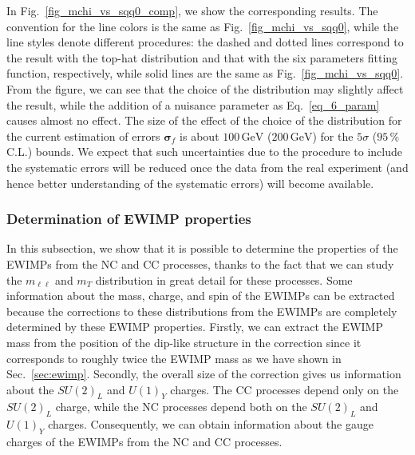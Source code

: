 \documentclass[12pt,twoside,book]{article}
\begin{document}
In Fig.~\ref{fig_mchi_vs_sqq0_comp}, we show the corresponding
results.  The convention for the line colors is the same as
Fig.~\ref{fig_mchi_vs_sqq0}, while the line styles denote different
procedures: the dashed and dotted lines correspond to the result with
the top-hat distribution and that with the six parameters fitting
function, respectively, while solid lines are the same as
Fig.~\ref{fig_mchi_vs_sqq0}.  From the figure, we can see that the
choice of the distribution may slightly affect the result, while the
addition of a nuisance parameter as Eq.~\eqref{eq_6_param} causes
almost no effect.  The size of the effect of the choice of the
distribution for the current estimation of errors $\bm{\sigma}_f$ is
about $100\,\mathrm{GeV}$ ($200\,\mathrm{GeV}$) for the $5\sigma$
($95\,\%$ C.L.) bounds.  We expect that such uncertainties due to the
procedure to include the systematic errors will be reduced once the
data from the real experiment (and hence better understanding of the
systematic errors) will become available.

\subsubsection{Determination of EWIMP properties}
\label{sec_property}

In this subsection, we show that it is possible to determine the
properties of the EWIMPs from the NC and CC processes, thanks to the
fact that we can study the $m_{\ell\ell}$ and $m_T$ distribution in
great detail for these processes.  Some information about the mass,
charge, and spin of the EWIMPs can be extracted because the
corrections to these distributions from the EWIMPs are completely
determined by these EWIMP properties.  Firstly, we can extract the
EWIMP mass from the position of the dip-like structure in the
correction since it corresponds to roughly twice the EWIMP mass as we
have shown in Sec.~\ref{sec:ewimp}.  Secondly, the overall size of the
correction gives us information about the $SU(2)_L$ and $U(1)_Y$
charges.  The CC processes depend only on the $SU(2)_L$ charge, while
the NC processes depend both on the $SU(2)_L$ and $U(1)_Y$ charges.
Consequently, we can obtain information about the gauge charges of the
EWIMPs from the NC and CC processes.
\end{document}
